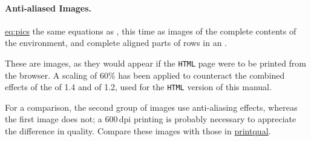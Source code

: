 \paragraph*{Anti-aliased Images.\label{ex:aalias}}
\hyperref{Here are}{Figure~}{ shows}{eq:pics} the same equations
as , this time as images of the 
complete contents of the  environment, 
and complete aligned parts of rows in an .
\begin{latexonly}
These are images, as they would appear if the \texttt{HTML} page
were to be printed from the browser. A scaling of 60\% has been
applied to counteract the combined effects of the  
of 1.4 and  of 1.2, 
used for the \texttt{HTML} version of this manual. 
\end{latexonly}
For a comparison, the second group of images use anti-aliasing effects, 
whereas the first image does not; a 600\,dpi printing is probably necessary
to appreciate the difference in quality. Compare these images with those in
\hyperref{a later section}{Section~}{}{printqual}.

